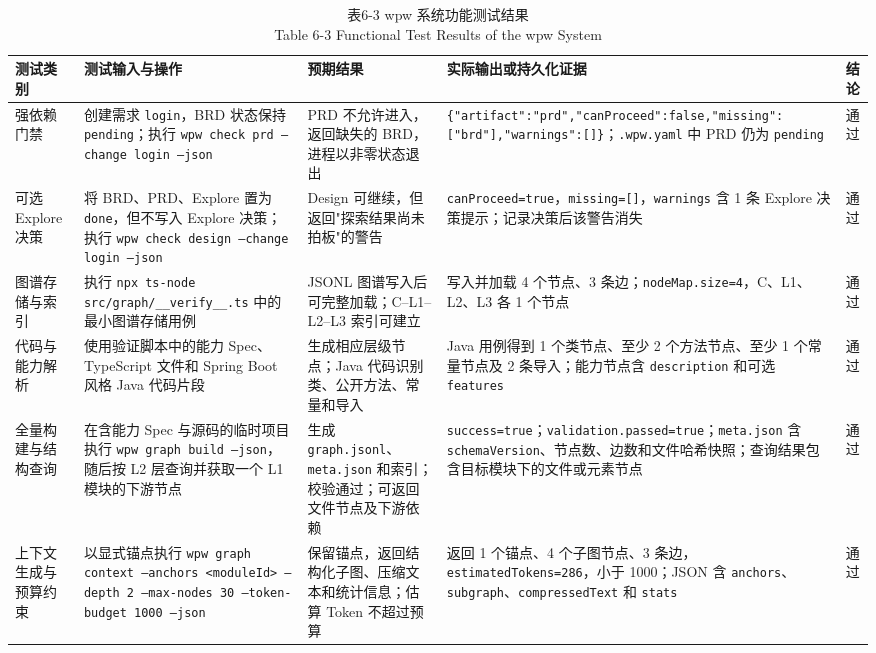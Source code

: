 \begin{table}[htbp]
\centering
\small
\caption{表6-3 wpw 系统功能测试结果\\Table 6-3 Functional Test Results of the wpw System}
\begin{tabularx}{\textwidth}{|X|X|X|X|X|}
\hline
\textbf{测试类别} & \textbf{测试输入与操作} & \textbf{预期结果} & \textbf{实际输出或持久化证据} & \textbf{结论} \\
\hline
强依赖门禁 & 创建需求 \texttt{login}，BRD 状态保持 \texttt{pending}；执行 \texttt{wpw check prd --change login --json} & PRD 不允许进入，返回缺失的 BRD，进程以非零状态退出 & \texttt{\{"artifact":"prd","canProceed":false,"missing":["brd"],"warnings":[]\}}；\texttt{.wpw.yaml} 中 PRD 仍为 \texttt{pending} & 通过 \\
可选 Explore 决策 & 将 BRD、PRD、Explore 置为 \texttt{done}，但不写入 Explore 决策；执行 \texttt{wpw check design --change login --json} & Design 可继续，但返回"探索结果尚未拍板"的警告 & \texttt{canProceed=true}，\texttt{missing=[]}，\texttt{warnings} 含 1 条 Explore 决策提示；记录决策后该警告消失 & 通过 \\
图谱存储与索引 & 执行 \texttt{npx ts-node src/graph/\_\_verify\_\_.ts} 中的最小图谱存储用例 & JSONL 图谱写入后可完整加载；C--L1--L2--L3 索引可建立 & 写入并加载 4 个节点、3 条边；\texttt{nodeMap.size=4}，C、L1、L2、L3 各 1 个节点 & 通过 \\
代码与能力解析 & 使用验证脚本中的能力 Spec、TypeScript 文件和 Spring Boot 风格 Java 代码片段 & 生成相应层级节点；Java 代码识别类、公开方法、常量和导入 & Java 用例得到 1 个类节点、至少 2 个方法节点、至少 1 个常量节点及 2 条导入；能力节点含 \texttt{description} 和可选 \texttt{features} & 通过 \\
全量构建与结构查询 & 在含能力 Spec 与源码的临时项目执行 \texttt{wpw graph build --json}，随后按 L2 层查询并获取一个 L1 模块的下游节点 & 生成 \texttt{graph.jsonl}、\texttt{meta.json} 和索引；校验通过；可返回文件节点及下游依赖 & \texttt{success=true}；\texttt{validation.passed=true}；\texttt{meta.json} 含 \texttt{schemaVersion}、节点数、边数和文件哈希快照；查询结果包含目标模块下的文件或元素节点 & 通过 \\
上下文生成与预算约束 & 以显式锚点执行 \texttt{wpw graph context --anchors <moduleId> --depth 2 --max-nodes 30 --token-budget 1000 --json} & 保留锚点，返回结构化子图、压缩文本和统计信息；估算 Token 不超过预算 & 返回 1 个锚点、4 个子图节点、3 条边，\texttt{estimatedTokens=286}，小于 1000；JSON 含 \texttt{anchors}、\texttt{subgraph}、\texttt{compressedText} 和 \texttt{stats} & 通过 \\

\end{tabularx}
\end{table}
